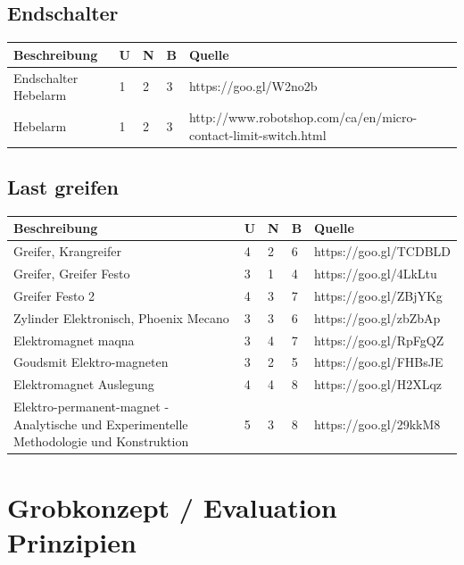 \documentclass[a4paper]{report}
\begin{document}
\section{Endschalter}
\label{app:ssec:FinButton}
\begin{tabular}{|p{}|p{}|p{}|p{}|p{}|}
	\hline
	\textbf{Beschreibung} & \textbf{U} & \textbf{N} & \textbf{B} & \textbf{Quelle} \\
	\hline
	Endschalter Hebelarm & 1 & 2 & 3 & https://goo.gl/W2no2b\\
	\hline
	Hebelarm & 1 & 2 & 3 & http://www.robotshop.com/ca/en/micro-contact-limit-switch.html\\
	\hline
\end{tabular}

\section{Last greifen}
\label{app:ssec:GrabbyGrabbyThingy}
\begin{tabular}{|p{}|p{}|p{}|p{}|p{}|}
	\hline
	\textbf{Beschreibung} & \textbf{U} & \textbf{N} & \textbf{B} & \textbf{Quelle} \\
	\hline
	Greifer, Krangreifer &4 &2 &6 & https://goo.gl/TCDBLD \\
	\hline
	Greifer, Greifer Festo &3 &1 &4 & https://goo.gl/4LkLtu\\
	\hline
	Greifer Festo 2 &4 &3 &7 & https://goo.gl/ZBjYKg\\
	\hline
	Zylinder Elektronisch, Phoenix Mecano &3 &3 &6 & https://goo.gl/zbZbAp\\
	\hline
	Elektromagnet maqna &3 &4 &7 & https://goo.gl/RpFgQZ\\
	\hline
	Goudsmit Elektro-magneten &3 &2 &5 & https://goo.gl/FHBsJE\\
	\hline
	Elektromagnet Auslegung &4 &4 &8 & https://goo.gl/H2XLqz\\
	\hline
	Elektro-permanent-magnet - Analytische und Experimentelle Methodologie und Konstruktion & 5 & 3 & 8 & https://goo.gl/29kkM8\\
  \hline
\end{tabular}

\chapter{Grobkonzept / Evaluation Prinzipien}
\label{app:ch:Grobkonzept}
\end{document}
